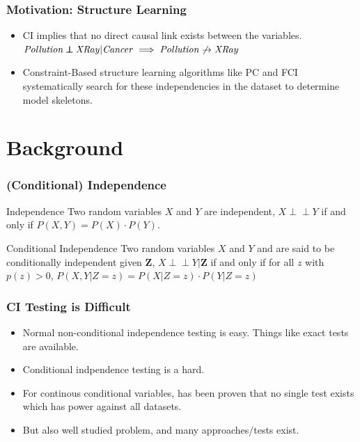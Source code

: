 \documentclass{beamer}
\def\ci{\perp\!\!\!\!\!\perp}
\begin{document}
\begin{frame}
	\frametitle{Motivation: Structure Learning}
	\begin{itemize}
		\setlength\itemsep{1em}
		\item CI implies that no direct causal link exists between the variables. \newline
		\hspace*{20pt} $ \text{\emph{Pollution}} \ci \text{\emph{XRay}} | \text{\emph{Cancer}} \implies \text{\emph{Pollution}} \not \rightarrow  \text{\emph{XRay}} $


		\item Constraint-Based structure learning algorithms like PC
			and FCI systematically search for these independencies
			in the dataset to determine model skeletons.
	\end{itemize}
\end{frame}

\section{Background}
\begin{frame}
	\frametitle{(Conditional) Independence}
	\begin{block}{Independence}
		Two random variables $ X $ and $ Y $ are independent,
		$ X \ci Y $ if and only if $ P(X, Y) = P(X) \cdot P(Y) $.
	\end{block}
	\vspace{1em}

	\begin{block}{Conditional Independence}
		Two random variables $ X $ and $ Y $ and are said to be
		conditionally independent given $ \bm{Z} $, $ X \ci Y | \bm{Z}
		$ if and only if for all $ z $ with $ p(z) > 0 $, $ P(X, Y |
		Z=z) = P(X | Z=z) \cdot P(Y | Z=z) $
	\end{block}
\end{frame}

\begin{frame}
	\frametitle{CI Testing is Difficult}
	\begin{itemize}
		\setlength\itemsep{1em}
		\item Normal non-conditional independence testing is easy.
			Things like exact tests are available. 
		\item Conditional indpendence testing is a hard.
		\item For continous conditional variables, has been proven that no single 
		      test exists which has power against all datasets. \footnotemark
		\item But also well studied problem, and many approaches/tests exist.
	\end{itemize}

\end{frame}
\end{document}
